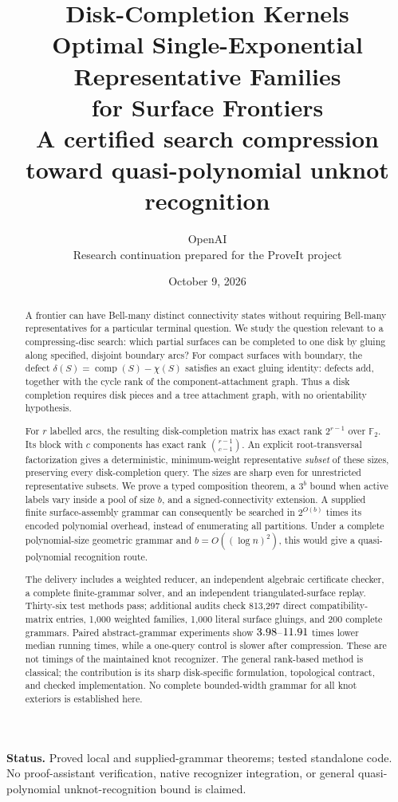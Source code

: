 \documentclass[11pt,a4paper]{article}
\title{\textbf{Disk-Completion Kernels}\\[5pt]
\Large Optimal Single-Exponential Representative Families\\for Surface Frontiers\\[6pt]
\large A certified search compression toward quasi-polynomial unknot recognition}
\author{OpenAI\\\small Research continuation prepared for the ProveIt project}
\date{October 9, 2026}
\theoremstyle{definition}
\theoremstyle{remark}
\newcommand{\F}{\mathbb F_2}
\newcommand{\ccomp}{\operatorname{comp}}
\begin{document}
\maketitle
\begin{abstract}
A frontier can have Bell-many distinct connectivity states without requiring Bell-many
representatives for a particular terminal question. We study the question relevant to a
compressing-disc search: which partial surfaces can be completed to one disk by gluing along
specified, disjoint boundary arcs? For compact surfaces with boundary, the defect
$\delta(S)=\ccomp(S)-\chi(S)$ satisfies an exact gluing identity: defects add, together with
the cycle rank of the component-attachment graph. Thus a disk completion requires disk
pieces and a tree attachment graph, with no orientability hypothesis.

For $r$ labelled arcs, the resulting disk-completion matrix has exact rank $2^{r-1}$ over
$\F$. Its block with $c$ components has exact rank $\binom{r-1}{c-1}$. An explicit
root-transversal factorization gives a deterministic, minimum-weight representative
\emph{subset} of these sizes, preserving every disk-completion query. The sizes are sharp
even for unrestricted representative subsets. We prove a typed composition theorem,
a $3^b$ bound when active labels vary inside a pool of size $b$, and a signed-connectivity
extension. A supplied finite surface-assembly grammar can consequently be searched in
$2^{O(b)}$ times its encoded polynomial overhead, instead of enumerating all partitions.
Under a complete polynomial-size geometric grammar and $b=O((\log n)^2)$, this would
give a quasi-polynomial recognition route.

The delivery includes a weighted reducer, an independent algebraic certificate checker,
a complete finite-grammar solver, and an independent triangulated-surface replay.
Thirty-six test methods pass; additional audits check 813,297 direct compatibility-matrix
entries, 1,000 weighted families, 1,000 literal surface gluings, and 200 complete grammars.
Paired abstract-grammar experiments show $3.98$--$11.91$ times lower median running times,
while a one-query control is slower after compression. These are not timings of the
maintained knot recognizer. The general rank-based method is classical; the contribution
is its sharp disk-specific formulation, topological contract, and checked implementation.
No complete bounded-width grammar for all knot exteriors is established here.
\end{abstract}
\noindent\textbf{Status.} Proved local and supplied-grammar theorems; tested standalone code.
No proof-assistant verification, native recognizer integration, or general
quasi-polynomial unknot-recognition bound is claimed.
\clearpage
\begingroup
\small
\setlength{\parskip}{0pt}
\tableofcontents
\endgroup
\clearpage
\end{document}
